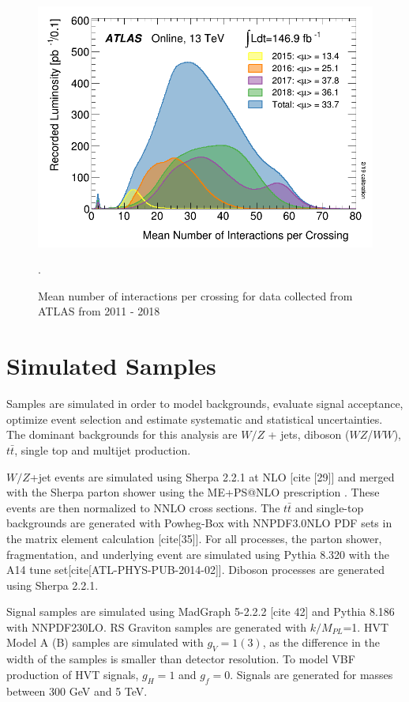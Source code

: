 \begin{figure}[h!]
  \centering
  \includegraphics[width=\hsize]{figures/Analysis/mu_profile.png}
  \caption{Mean number of interactions per crossing for data collected from ATLAS from 2011 - 2018}. 
  \label{fig:mu_profile}
\end{figure} 
\FloatBarrier


\section{Simulated Samples}
\label{Simulated Samples}
Samples are simulated in order to model backgrounds, evaluate signal acceptance, optimize event selection and estimate systematic and statistical uncertainties. The dominant backgrounds for this analysis are $W/Z$ + jets, diboson ($WZ$/$WW$), $t\bar{t}$, single top and multijet production. 

$W/Z$+jet events are simulated using Sherpa 2.2.1 at NLO [cite [29]] and merged with the Sherpa parton shower using the ME+PS@NLO prescription \cite{me_ps}. These events are then normalized to NNLO cross sections. The $t\bar{t}$ and single-top backgrounds are generated with Powheg-Box with NNPDF3.0NLO PDF sets in the matrix element calculation [cite[35]]. For all processes, the parton shower, fragmentation, and underlying event are simulated using Pythia 8.320 with the A14 tune set[cite[ATL-PHYS-PUB-2014-02]]. Diboson processes are generated using Sherpa 2.2.1. 

Signal samples are simulated using MadGraph 5-2.2.2 [cite 42] and Pythia 8.186 with NNPDF230LO. RS Graviton samples are generated with $k/M_{PL}$=1. HVT Model A (B) samples are simulated with $g_{V}=1(3)$, as the difference in the width of the samples is smaller than detector resolution. To model VBF production of HVT signals, $g_{H}=1$ and $g_{f}=0$. Signals are generated for masses between 300 GeV and 5 TeV.

